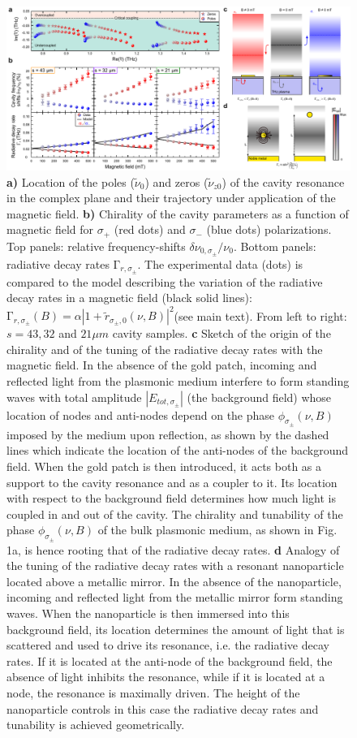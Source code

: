 \documentclass[twocolumn]{article}
\begin{document}
\newpage
\begin{figure}[ht]
	\centering %
	\includegraphics[width=\textwidth]{Figure_4.pdf}
	\caption{\textbf{a)} Location of the poles ($\tilde{\nu}_0$) and zeros ($\tilde{\nu}_{z0}$) of the cavity resonance in the complex plane and their trajectory  under application of the magnetic field. \textbf{b)} Chirality of the cavity parameters as a function of magnetic field for $\sigma_{+}$ (red dots) and $\sigma_{-}$ (blue dots) polarizations. Top panels: relative frequency-shifts $\delta{\nu }_{0,\sigma_{\pm}}/{\nu}_{0} $. Bottom panels: radiative decay rates ${\mathrm{\Gamma }}_{r,\sigma_{\pm}}$. The experimental data (dots) is compared to the model describing the variation of the radiative decay rates in a magnetic field (black solid lines): ${\mathrm{\Gamma }}_{r,\sigma_{\pm}}(B)=\alpha \left| 1+\tilde{r}_{\sigma_{\pm},0}(\nu,B) \right| ^2 $(see main text). From left to right: $s=43, 32$ and $21 \mu m$ cavity samples. \textbf{c} Sketch of the origin of the chirality and of the tuning of the radiative decay rates with the magnetic field. In the absence of the gold patch, incoming and reflected light from the plasmonic medium interfere to form standing waves with total amplitude  $\left| E_{tot,\sigma_{\pm}}\right|$ (the background field) whose location of nodes and anti-nodes depend on the phase $\phi_{\sigma_{\pm}}(\nu,B)$ imposed by the medium upon reflection, as shown by the dashed lines which indicate the location of the anti-nodes of the background field. When the gold patch is then introduced, it acts both as a support to the cavity resonance and as a coupler to it. Its location with respect to the background field determines how much light is coupled in and out of the cavity. The chirality and tunability of the phase $\phi_{\sigma_{\pm}}(\nu,B)$ of the bulk plasmonic medium, as shown in Fig. 1a, is hence rooting that of the radiative decay rates. \textbf{d} Analogy of the tuning of the radiative decay rates with a resonant nanoparticle located above a metallic mirror. In the absence of the nanoparticle, incoming and reflected light from the metallic mirror form standing waves. When the nanoparticle is then immersed into this background field, its location determines the amount of light that is scattered and used to drive its resonance, i.e. the radiative decay rates. If it is located at the anti-node of the background field, the absence of light inhibits the resonance, while if it is located at a node, the resonance is maximally driven.  The height of the nanoparticle controls in this case the radiative decay rates and tunability is achieved geometrically.}
	\label{fig:4}
\end{figure}
\end{document}
